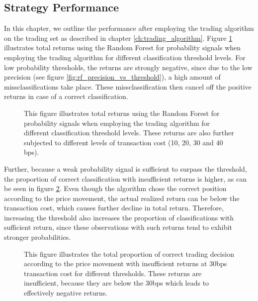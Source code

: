 \subsection{Strategy Performance} \label{ch:strategy_performance}
In this chapter, we outline the performance after employing the trading algorithm on the 
trading set as described in chapter \ref{ch:trading_algorithm}.
Figure \ref{fig:rf_returns_by_thresholds} illustrates total returns using the Random Forest for probability signals when employing the trading 
algorithm for different classification threshold levels. 
For low probability thresholds, the returns are strongly negative, since due to the low precision (see figure \ref{fig:rf_precision_vs_threshold}),
a high amount of missclassifications take place. 
These missclassification then cancel off the positive returns in case of a correct classification.

\begin{figure}[H]
    \captionsetup{format=plain}
    \caption{ 
            This figure illustrates total returns using the Random Forest for probability signals when employing the trading 
            algorithm for different classification threshold levels. 
            These returns are also further subjected to different levels of transaction cost (10, 20, 30 and 40 bps).
        }
    \label{fig:rf_returns_by_thresholds}
\end{figure}

Further, because a weak probability signal is sufficient to surpass the threshold, 
the proportion of correct classification with insufficient returns is higher, as can be seen in figure \ref{fig:proportion_insufficient_returns}.
Even though the algorithm chose the correct position according to the price movement,
the actual realized return can be below the transaction cost, which causes further decline in total return.
Therefore, increasing the threshold also increases the proportion of classifications with sufficient return,
since these observations with such returns tend to exhibit stronger probabilities.


\begin{figure}[H]
    \captionsetup{format=plain}
    \caption{ 
            This figure illustrates the total proportion of correct trading decision according to the price movement with 
            insufficient returns at 30bps transaction cost for different thresholds. 
            These returns are insufficient, because they are below the 30bps which leads to effectively negative returns.
        }
    \label{fig:proportion_insufficient_returns}
\end{figure}

